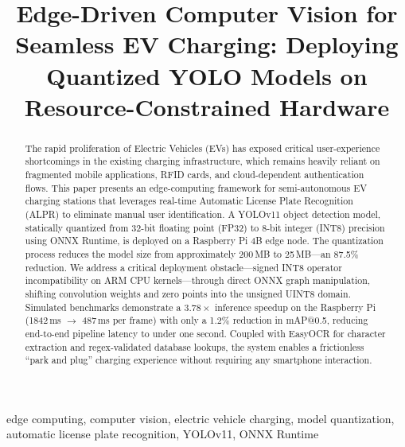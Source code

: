 \documentclass[conference]{IEEEtran}
\begin{document}
\title{Edge-Driven Computer Vision for Seamless EV Charging: Deploying Quantized YOLO Models on Resource-Constrained Hardware\\
{\footnotesize \textsuperscript{}}
}

\author{
}

\maketitle

\begin{abstract}
The rapid proliferation of Electric Vehicles (EVs) has exposed critical user-experience shortcomings in the existing charging infrastructure, which remains heavily reliant on fragmented mobile applications, RFID cards, and cloud-dependent authentication flows. This paper presents an edge-computing framework for semi-autonomous EV charging stations that leverages real-time Automatic License Plate Recognition (ALPR) to eliminate manual user identification. A YOLOv11 object detection model, statically quantized from 32-bit floating point (FP32) to 8-bit integer (INT8) precision using ONNX Runtime, is deployed on a Raspberry Pi 4B edge node. The quantization process reduces the model size from approximately 200\,MB to 25\,MB---an 87.5\% reduction. We address a critical deployment obstacle---signed INT8 operator incompatibility on ARM CPU kernels---through direct ONNX graph manipulation, shifting convolution weights and zero points into the unsigned UINT8 domain. Simulated benchmarks demonstrate a $3.78\times$ inference speedup on the Raspberry Pi (1842\,ms $\to$ 487\,ms per frame) with only a 1.2\% reduction in mAP@0.5, reducing end-to-end pipeline latency to under one second. Coupled with EasyOCR for character extraction and regex-validated database lookups, the system enables a frictionless ``park and plug'' charging experience without requiring any smartphone interaction.
\end{abstract}

\begin{IEEEkeywords}
edge computing, computer vision, electric vehicle charging, model quantization, automatic license plate recognition, YOLOv11, ONNX Runtime
\end{IEEEkeywords}
\end{document}
